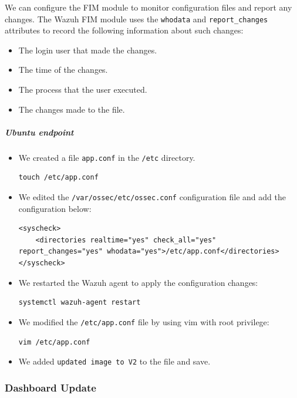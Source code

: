 We can configure the FIM module to monitor configuration files and report any changes. The Wazuh FIM module uses the \texttt{whodata} and \texttt{report\_changes} attributes to record the following information about such changes:

\begin{itemize}
    \item The login user that made the changes.
    \item The time of the changes.
    \item The process that the user executed.
    \item The changes made to the file.
\end{itemize}


\subparagraph{Ubuntu endpoint}
\begin{itemize}
    \item We created a file \texttt{app.conf} in the \texttt{/etc} directory.
    \begin{verbatim}
touch /etc/app.conf
    \end{verbatim}
    \item We edited the \texttt{/var/ossec/etc/ossec.conf} configuration file and add the configuration below:
    \begin{verbatim}
<syscheck>
    <directories realtime="yes" check_all="yes" report_changes="yes" whodata="yes">/etc/app.conf</directories>
</syscheck>
    \end{verbatim}

    \item We restarted the Wazuh agent to apply the configuration changes:
          \begin{verbatim}
systemctl wazuh-agent restart
    \end{verbatim}
    \item We modified the \texttt{/etc/app.conf} file by using vim with root privilege:
          \begin{verbatim}
vim /etc/app.conf
    \end{verbatim}
    \item We added \texttt{updated image to V2} to the file and save.
\end{itemize}

\subsubsection{Dashboard Update}
